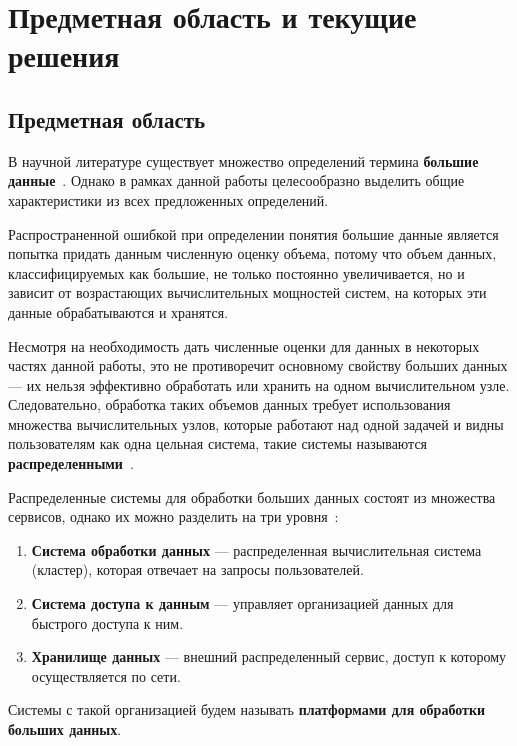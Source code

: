 \section{Предметная область и текущие решения}
\subsection{Предметная область}\label{subsec:definition}

В научной литературе существует множество определений термина \textbf{большие данные}~\cite{Bigdata_a_review, Bigdata_an_introduction, Challenges_of_big_data_analysis}. Однако в рамках данной работы целесообразно выделить общие характеристики из всех предложенных определений. 

Распространенной ошибкой при определении понятия большие данные является попытка придать данным численную оценку объема, потому что объем данных, классифицируемых как большие, не только постоянно увеличивается, но и зависит от возрастающих вычислительных мощностей систем, на которых эти данные обрабатываются и хранятся. 

Несмотря на необходимость дать численные оценки для данных в некоторых частях данной работы, это не противоречит основному свойству больших данных --- их нельзя эффективно обработать или хранить на одном вычислительном узле. Следовательно, обработка таких объемов данных требует использования множества вычислительных узлов, которые работают над одной задачей и видны пользователям как одна цельная система, такие системы называются \textbf{распределенными}~\cite{Time_clocks_and_the_ordering_of_events_in_a_distributed_system}.

Распределенные системы для обработки больших данных состоят из множества сервисов, однако их можно разделить на три уровня~\cite{Spatial_big_data_architecture}:
\begin{enumerate}
    \item \textbf{Система обработки данных} --- распределенная вычислительная система (кластер), которая отвечает на запросы пользователей.
    \item \textbf{Система доступа к данным} --- управляет организацией данных для быстрого доступа к ним.
    \item \textbf{Хранилище данных} --- внешний распределенный сервис, доступ к которому осуществляется по сети.
\end{enumerate}
Системы с такой организацией будем называть \textbf{платформами для обработки больших данных}.


